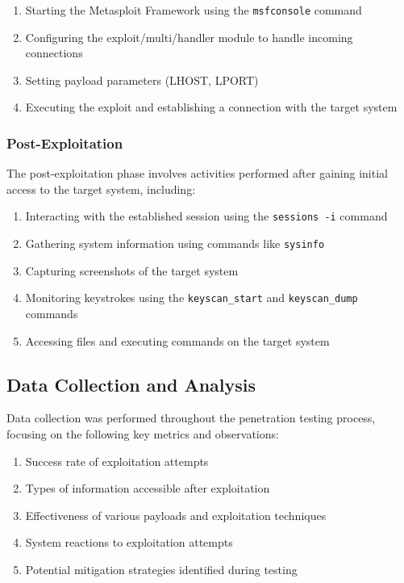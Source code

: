 \documentclass[journal,twoside]{IEEEtran}
\begin{document}
\begin{enumerate}
    \item Starting the Metasploit Framework using the \texttt{msfconsole} command
    \item Configuring the exploit/multi/handler module to handle incoming connections
    \item Setting payload parameters (LHOST, LPORT)
    \item Executing the exploit and establishing a connection with the target system
\end{enumerate}

\subsubsection{Post-Exploitation}
The post-exploitation phase involves activities performed after gaining initial access to the target system, including:

\begin{enumerate}
    \item Interacting with the established session using the \texttt{sessions -i} command
    \item Gathering system information using commands like \texttt{sysinfo}
    \item Capturing screenshots of the target system
    \item Monitoring keystrokes using the \texttt{keyscan\_start} and \texttt{keyscan\_dump} commands
    \item Accessing files and executing commands on the target system
\end{enumerate}

\subsection{Data Collection and Analysis}
Data collection was performed throughout the penetration testing process, focusing on the following key metrics and observations:

\begin{enumerate}
    \item Success rate of exploitation attempts
    \item Types of information accessible after exploitation
    \item Effectiveness of various payloads and exploitation techniques
    \item System reactions to exploitation attempts
    \item Potential mitigation strategies identified during testing
\end{enumerate}
\end{document}
